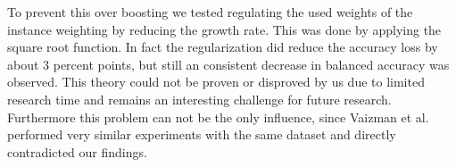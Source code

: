To prevent this over boosting we tested regulating the used weights of the instance weighting by reducing the growth rate. This was done by applying the square root function. In fact the regularization did reduce the accuracy loss by about 3 percent points, but still an consistent decrease in balanced accuracy was observed. This theory could not be proven or disproved by us due to limited research time and remains an interesting challenge for future research. Furthermore this problem can not be the only influence, since Vaizman et al. performed very similar experiments with the same dataset and directly contradicted our findings.